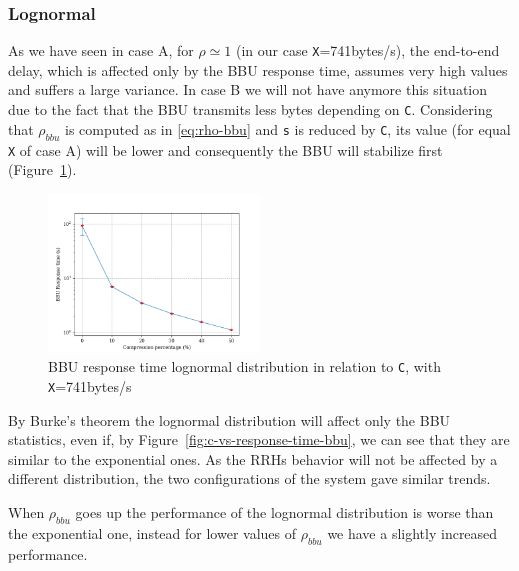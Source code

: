 \documentclass[11pt,a4paper,oneside, openright]{article}
\begin{document}
\subsubsection{Lognormal}
As we have seen in case A, for $\rho \simeq 1$ (in our case \texttt{X}=741bytes/s), the end-to-end delay, which is affected only by the BBU response time, assumes very high values and suffers a large variance. In case B we will not have anymore this situation due to the fact that the BBU transmits less bytes depending on \texttt{C}. Considering that $\rho_{bbu}$ is computed as in \ref{eq:rho-bbu} and \texttt{s} is reduced by \texttt{C}, its value (for equal \texttt{X} of case A) will be lower and consequently the BBU will stabilize first (Figure~\ref{fig:c-vs-resp-741-logn}).

\begin{figure}[h]
	\centering
	\includegraphics[width=0.5\textwidth]{images/response-time-bbu-741-logn}
	\caption{BBU response time lognormal distribution in relation to \texttt{C}, with \texttt{X}=741bytes/s}
	\label{fig:c-vs-resp-741-logn}
\end{figure}

By Burke's theorem the lognormal distribution will affect only the BBU statistics, even if, by Figure~\ref{fig:c-vs-response-time-bbu}, we can see that they are similar to the exponential ones. As the RRHs behavior will not be affected by a different distribution, the two configurations of the system gave similar trends. 

When $\rho_{bbu}$ goes up the performance of the lognormal distribution is worse than the exponential one, instead for lower values of $\rho_{bbu}$ we have a slightly increased performance. %
\end{document}
